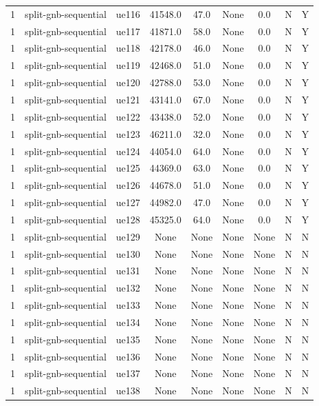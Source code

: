 \begin{table}[ht]
\begin{tabular}{|c|c|c|c|c|c|c|c|c|}
1 & split-gnb-sequential & ue116 & 41548.0 & 47.0 & None & 0.0 & N & Y \\
1 & split-gnb-sequential & ue117 & 41871.0 & 58.0 & None & 0.0 & N & Y \\
1 & split-gnb-sequential & ue118 & 42178.0 & 46.0 & None & 0.0 & N & Y \\
1 & split-gnb-sequential & ue119 & 42468.0 & 51.0 & None & 0.0 & N & Y \\
1 & split-gnb-sequential & ue120 & 42788.0 & 53.0 & None & 0.0 & N & Y \\
1 & split-gnb-sequential & ue121 & 43141.0 & 67.0 & None & 0.0 & N & Y \\
1 & split-gnb-sequential & ue122 & 43438.0 & 52.0 & None & 0.0 & N & Y \\
1 & split-gnb-sequential & ue123 & 46211.0 & 32.0 & None & 0.0 & N & Y \\
1 & split-gnb-sequential & ue124 & 44054.0 & 64.0 & None & 0.0 & N & Y \\
1 & split-gnb-sequential & ue125 & 44369.0 & 63.0 & None & 0.0 & N & Y \\
1 & split-gnb-sequential & ue126 & 44678.0 & 51.0 & None & 0.0 & N & Y \\
1 & split-gnb-sequential & ue127 & 44982.0 & 47.0 & None & 0.0 & N & Y \\
1 & split-gnb-sequential & ue128 & 45325.0 & 64.0 & None & 0.0 & N & Y \\
1 & split-gnb-sequential & ue129 & None & None & None & None & N & N \\
1 & split-gnb-sequential & ue130 & None & None & None & None & N & N \\
1 & split-gnb-sequential & ue131 & None & None & None & None & N & N \\
1 & split-gnb-sequential & ue132 & None & None & None & None & N & N \\
1 & split-gnb-sequential & ue133 & None & None & None & None & N & N \\
1 & split-gnb-sequential & ue134 & None & None & None & None & N & N \\
1 & split-gnb-sequential & ue135 & None & None & None & None & N & N \\
1 & split-gnb-sequential & ue136 & None & None & None & None & N & N \\
1 & split-gnb-sequential & ue137 & None & None & None & None & N & N \\
1 & split-gnb-sequential & ue138 & None & None & None & None & N & N \\

\end{tabular}
\end{table}
